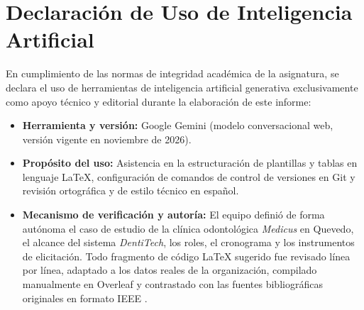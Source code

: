 \section{Declaraci{\'o}n de Uso de Inteligencia Artificial}

En cumplimiento de las normas de integridad acad{\'e}mica de la asignatura, se declara el uso de herramientas de inteligencia artificial generativa exclusivamente como apoyo t{\'e}cnico y editorial durante la elaboraci{\'o}n de este informe:

\begin{itemize}
    \item \textbf{Herramienta y versi{\'o}n:} Google Gemini (modelo conversacional web, versi{\'o}n vigente en noviembre de 2026).
    \item \textbf{Prop{\'o}sito del uso:} Asistencia en la estructuraci{\'o}n de plantillas y tablas en lenguaje LaTeX, configuraci{\'o}n de comandos de control de versiones en Git y revisi{\'o}n ortogr{\'a}fica y de estilo t{\'e}cnico en espa{\~n}ol.
    \item \textbf{Mecanismo de verificaci{\'o}n y autor{\'i}a:} El equipo defini{\'o} de forma aut{\'o}noma el caso de estudio de la cl{\'i}nica odontol{\'o}gica \textit{Medicus} en Quevedo, el alcance del sistema \textit{DentiTech}, los roles, el cronograma y los instrumentos de elicitaci{\'o}n. Todo fragmento de c{\'o}digo LaTeX sugerido fue revisado l{\'i}nea por l{\'i}nea, adaptado a los datos reales de la organizaci{\'o}n, compilado manualmente en Overleaf y contrastado con las fuentes bibliogr{\'a}ficas originales en formato IEEE \cite{iso29148, pohl2025, ireb2026}.
\end{itemize}
